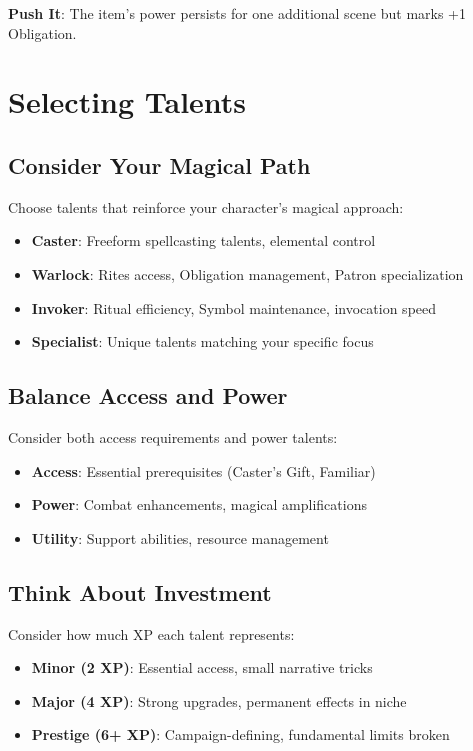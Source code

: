\textbf{Push It}: The item's power persists for one additional scene but marks +1 Obligation.

\section{Selecting Talents}

\subsection*{Consider Your Magical Path}
Choose talents that reinforce your character's magical approach:
\begin{itemize}
\item \textbf{Caster}: Freeform spellcasting talents, elemental control
\item \textbf{Warlock}: Rites access, Obligation management, Patron specialization
\item \textbf{Invoker}: Ritual efficiency, Symbol maintenance, invocation speed
\item \textbf{Specialist}: Unique talents matching your specific focus
\end{itemize}

\subsection*{Balance Access and Power}
Consider both access requirements and power talents:
\begin{itemize}
\item \textbf{Access}: Essential prerequisites (Caster's Gift, Familiar)
\item \textbf{Power}: Combat enhancements, magical amplifications
\item \textbf{Utility}: Support abilities, resource management
\end{itemize}

\subsection*{Think About Investment}
Consider how much XP each talent represents:
\begin{itemize}
\item \textbf{Minor (2 XP)}: Essential access, small narrative tricks
\item \textbf{Major (4 XP)}: Strong upgrades, permanent effects in niche
\item \textbf{Prestige (6+ XP)}: Campaign-defining, fundamental limits broken
\end{itemize}

